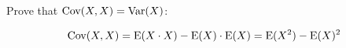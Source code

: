 \question Prove that $\text{Cov}(X, X) = \text{Var}(X)$:
\begin{solution}[2cm]
	\[\text{Cov}(X, X) = \text{E} (X \cdot X) - \text{E} (X) \cdot \text{E}(X) = \text{E}(X^2) - \text{E}(X)^2\]
\end{solution}